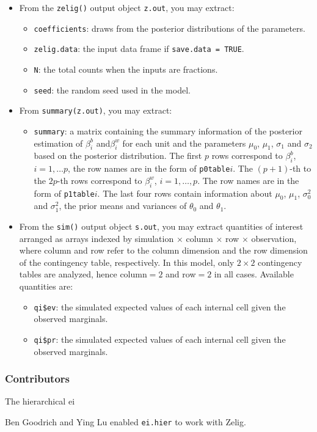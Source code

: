 \begin{itemize}
\item From the \texttt{zelig()} output object \texttt{z.out}, 
you may extract:

\begin{itemize}
\item \texttt{coefficients}: draws from the posterior distributions
of the parameters.
   \item {\tt zelig.data}: the input data frame if {\tt save.data = TRUE}.  
\item \texttt{N}: the total counts when the inputs are fractions.
\item \texttt{seed}: the random seed used in the model.
\end{itemize}

\item From \texttt{summary(z.out)}, you may extract:
\begin{itemize}
\item \texttt{summary}: a matrix containing the summary information of the 
posterior estimation of $\beta^b_i$ and$\beta^w_i$ for each unit and
the parameters $\mu_0$, $\mu_1$, $\sigma_1$ and $\sigma_2$ based on
the posterior distribution.  The first $p$ rows correspond to
$\beta_i^b$, $i=1,\ldots p$, the row names are in the form of
\texttt{p0table}$i$. The $(p+1)$-th to the $2p$-th rows correspond to
$\beta_i^w$, $i=1,\ldots,p$. The row names are in the form of
\texttt{p1table}$i$. The last four rows contain information about
$\mu_0$, $\mu_1$, $\sigma_0^2$ and $\sigma_1^2$, the prior means and
variances of $\theta_0$ and $\theta_1$. 
\end{itemize}
\item From the \texttt{sim()} output object \texttt{s.out}, you may
extract quantities of interest arranged as arrays indexed by
simulation $\times$ column $\times$ row $\times$ observation, where
column and row refer to the column dimension and the row dimension of
the contingency table, respectively. In this model, only $2 \times 2$
contingency tables are analyzed, hence column$=2$ and row$=2$ in all
cases. Available quantities are:
\begin{itemize}
\item \texttt{qi\$ev}: the simulated expected values of each internal cell
given the observed marginals. 
\item \texttt{qi\$pr}: the simulated expected values of each internal cell 
given the observed marginals.  
\end{itemize}

\end{itemize}

\subsubsection{Contributors}

The hierarchical {\sc ei} 

\noindent Ben Goodrich and Ying Lu enabled \texttt{ei.hier} to work with Zelig.

